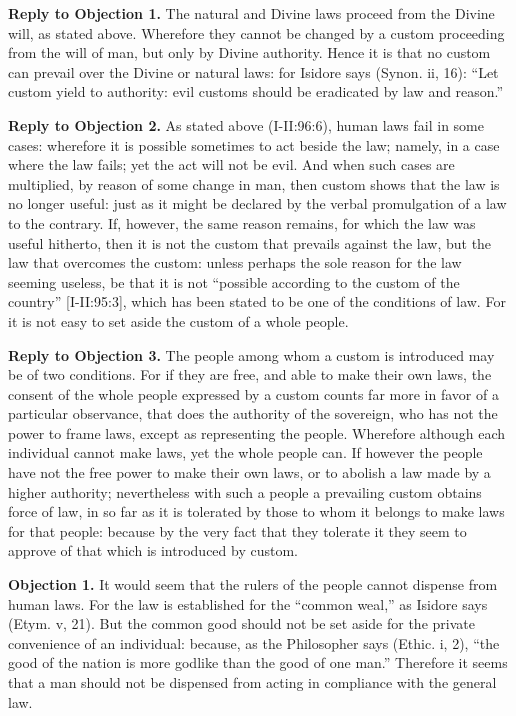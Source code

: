 \textbf{Reply to Objection 1.} The natural and Divine laws proceed from the Divine will, as stated above. Wherefore they cannot be changed by a custom proceeding from the will of man, but only by Divine authority. Hence it is that no custom can prevail over the Divine or natural laws: for Isidore says (Synon. ii, 16): ``Let custom yield to authority: evil customs should be eradicated by law and reason.''

\textbf{Reply to Objection 2.} As stated above (I-II:96:6), human laws fail in some cases: wherefore it is possible sometimes to act beside the law; namely, in a case where the law fails; yet the act will not be evil. And when such cases are multiplied, by reason of some change in man, then custom shows that the law is no longer useful: just as it might be declared by the verbal promulgation of a law to the contrary. If, however, the same reason remains, for which the law was useful hitherto, then it is not the custom that prevails against the law, but the law that overcomes the custom: unless perhaps the sole reason for the law seeming useless, be that it is not ``possible according to the custom of the country'' [I-II:95:3], which has been stated to be one of the conditions of law. For it is not easy to set aside the custom of a whole people.

\textbf{Reply to Objection 3.} The people among whom a custom is introduced may be of two conditions. For if they are free, and able to make their own laws, the consent of the whole people expressed by a custom counts far more in favor of a particular observance, that does the authority of the sovereign, who has not the power to frame laws, except as representing the people. Wherefore although each individual cannot make laws, yet the whole people can. If however the people have not the free power to make their own laws, or to abolish a law made by a higher authority; nevertheless with such a people a prevailing custom obtains force of law, in so far as it is tolerated by those to whom it belongs to make laws for that people: because by the very fact that they tolerate it they seem to approve of that which is introduced by custom.


\textbf{Objection 1.} It would seem that the rulers of the people cannot dispense from human laws. For the law is established for the ``common weal,'' as Isidore says (Etym. v, 21). But the common good should not be set aside for the private convenience of an individual: because, as the Philosopher says (Ethic. i, 2), ``the good of the nation is more godlike than the good of one man.'' Therefore it seems that a man should not be dispensed from acting in compliance with the general law.

